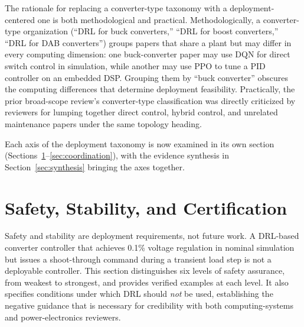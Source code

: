 \documentclass[manuscript,screen,review]{acmart}
\begin{document}
The rationale for replacing a converter-type taxonomy with a deployment-centered one is both methodological and practical.
Methodologically, a converter-type organization (``DRL for buck converters,'' ``DRL for boost converters,'' ``DRL for DAB converters'') groups papers that share a plant but may differ in every computing dimension: one buck-converter paper may use DQN for direct switch control in simulation, while another may use PPO to tune a PID controller on an embedded DSP.
Grouping them by ``buck converter'' obscures the computing differences that determine deployment feasibility.
Practically, the prior broad-scope review's converter-type classification was directly criticized by reviewers for lumping together direct control, hybrid control, and unrelated maintenance papers under the same topology heading.

Each axis of the deployment taxonomy is now examined in its own section (Sections~\ref{sec:safety}--\ref{sec:coordination}), with the evidence synthesis in Section~\ref{sec:synthesis} bringing the axes together.

\section{Safety, Stability, and Certification}
\label{sec:safety}

Safety and stability are deployment requirements, not future work.
A DRL-based converter controller that achieves 0.1\% voltage regulation in nominal simulation but issues a shoot-through command during a transient load step is not a deployable controller.
This section distinguishes six levels of safety assurance, from weakest to strongest, and provides verified examples at each level.
It also specifies conditions under which DRL should \emph{not} be used, establishing the negative guidance that is necessary for credibility with both computing-systems and power-electronics reviewers.
\end{document}

